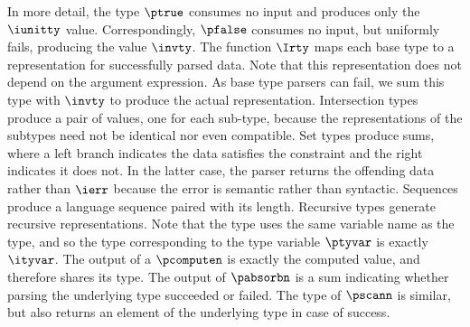 In more detail,
the \ddc{} type $\ptrue$ consumes no input and produces only
the $\iunitty$ value.  Correspondingly, $\pfalse$ consumes no input,
but uniformly fails, producing the value $\invty$. The
function $\Irty$ maps each base type to a representation for
successfully parsed data. Note that this representation does not depend
on the argument expression. As base type parsers can fail, we sum this type
with $\invty$ to produce the actual representation.
Intersection types produce a pair of values, one for each sub-type,
because the representations of the subtypes need not be identical nor
even compatible. 
Set types produce sums, where a left branch indicates the data
satisfies the constraint and the right indicates it does not. In
the latter case, the parser returns the offending data rather than
$\ierr$ because the error is semantic rather than syntactic.
Sequences produce a \implang{} language sequence paired with its
length.  Recursive types generate recursive representations. Note that the \implang{} type uses the same variable name
as the \ddc{} type, and so the type corresponding to the type variable
$\ptyvar$ is exactly $\ityvar$.
The output of a $\pcomputen$ is exactly the computed value, and
therefore shares its type.  The output of $\pabsorbn$ is a sum
indicating whether parsing the underlying type succeeded or failed.
The type of $\pscann$ is similar, but also returns an element of the
underlying type in case of success.

